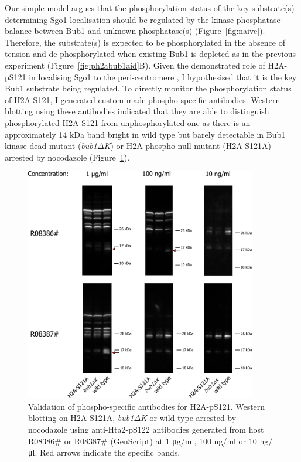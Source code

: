 Our simple model argues that the phosphorylation status of the key substrate(s) determining Sgo1 localisation should be regulated by the kinase-phosphatase balance between Bub1 and unknown phosphatase(s) (Figure~\ref{fig:naive}). Therefore, the substrate(s) is expected to be phosphorylated in the absence of tension and de-phosphorylated when existing Bub1 is depleted as in the previous experiment (Figure~\ref{fig:ph2abub1aid}B). Given the demonstrated role of H2A-pS121 in localising Sgo1 to the peri-centromere \citep{Kawashima2010a, Fernius2007Bub1Mitosis, Nerusheva2014}, I hypothesised that it is the key Bub1 substrate being regulated. To directly monitor the phosphorylation status of H2A-S121, I generated custom-made phospho-specific antibodies. Western blotting using these antibodies indicated that they are able to distinguish phosphorylated H2A-S121 from unphosphorylated one as there is an approximately 14 \si{\kilo\dalton} band bright in wild type but barely detectable in Bub1 kinase-dead mutant (\textit{bub1$\Delta$K}) or H2A phospho-null mutant (H2A-S121A) arrested by nocodazole (Figure~\ref{fig:abtest}). 

\begin{figure}[htbp]
  \centering
  \includegraphics[width=0.9\textwidth]{chapter3/figures/pH2A ab test.pdf}
  \caption[Validation of phospho-specific antibodies for H2A-pS121]{Validation of phospho-specific antibodies for H2A-pS121. Western blotting on H2A-S121A, \textit{bub1$\Delta$K} or wild type arrested by nocodazole using anti-Hta2-pS122 antibodies generated from host R08386\# or R08387\# (GenScript) at 1 \si{\micro\gram/\milli\litre}, 100 \si{\nano\gram/\milli\litre} or 10 \si{\nano\gram/\micro\litre}. Red arrows indicate the specific bands. }
  \label{fig:abtest}
\end{figure} 

